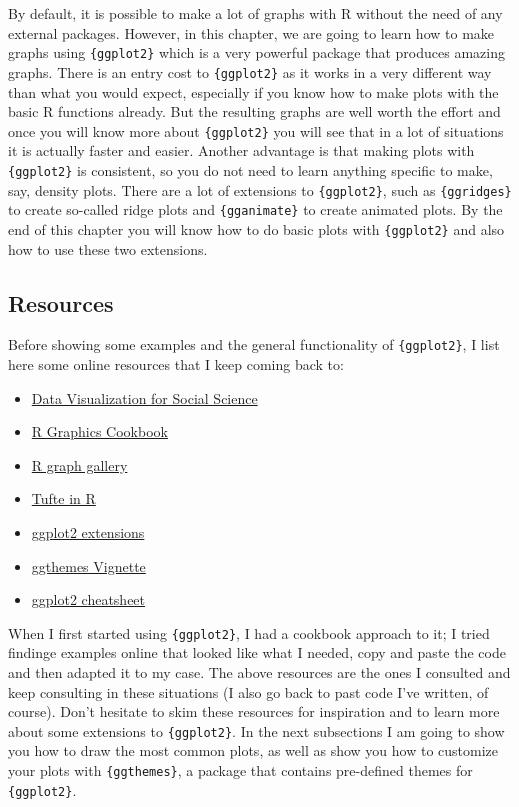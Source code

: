 \documentclass[]{gitbook}
\begin{document}
By default, it is possible to make a lot of graphs with R without the need of any external
packages. However, in this chapter, we are going to learn how to make graphs using \texttt{\{ggplot2\}} which
is a very powerful package that produces amazing graphs. There is an entry cost to \texttt{\{ggplot2\}} as it
works in a very different way than what you would expect, especially if you know how to make plots
with the basic R functions already. But the resulting graphs are well worth the effort and once
you will know more about \texttt{\{ggplot2\}} you will see that in a lot of situations it is actually faster
and easier. Another advantage is that making plots with \texttt{\{ggplot2\}} is consistent, so you do not need
to learn anything specific to make, say, density plots. There are a lot of extensions to \texttt{\{ggplot2\}},
such as \texttt{\{ggridges\}} to create so-called ridge plots and \texttt{\{gganimate\}} to create animated plots. By
the end of this chapter you will know how to do basic plots with \texttt{\{ggplot2\}} and also how to use these
two extensions.

\hypertarget{resources}{%
\subsection{Resources}\label{resources}}

Before showing some examples and the general functionality of \texttt{\{ggplot2\}}, I list here some online
resources that I keep coming back to:

\begin{itemize}
\item
  \href{http://socviz.co/}{Data Visualization for Social Science}
\item
  \href{http://www.cookbook-r.com/Graphs/}{R Graphics Cookbook}
\item
  \href{http://www.r-graph-gallery.com/portfolio/ggplot2-package/}{R graph gallery}
\item
  \href{http://motioninsocial.com/tufte/}{Tufte in R}
\item
  \href{http://www.ggplot2-exts.org/gallery/}{ggplot2 extensions}
\item
  \href{https://cran.r-project.org/web/packages/ggthemes/vignettes/ggthemes.html}{ggthemes Vignette}
\item
  \href{https://www.rstudio.com/wp-content/uploads/2015/03/ggplot2-cheatsheet.pdf}{ggplot2 cheatsheet}
\end{itemize}

When I first started using \texttt{\{ggplot2\}}, I had a cookbook approach to it; I tried findinge examples
online that looked like what I needed, copy and paste the code and then adapted it to my case. The above resources
are the ones I consulted and keep consulting in these situations (I also go back to past code I've written, of
course). Don't hesitate to skim these resources for inspiration and to learn more about some
extensions to \texttt{\{ggplot2\}}. In the next subsections I am going to show you how to draw the most common
plots, as well as show you how to customize your plots with \texttt{\{ggthemes\}}, a package that contains pre-defined
themes for \texttt{\{ggplot2\}}.
\end{document}
